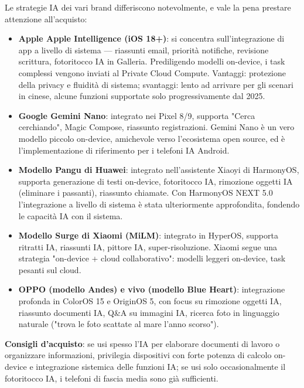 
Le strategie IA dei vari brand differiscono notevolmente, e vale la pena prestare attenzione all'acquisto:

\begin{itemize}
  \item \textbf{Apple Apple Intelligence (iOS 18+)}: si concentra sull'integrazione di app a livello di sistema — riassunti email, priorità notifiche, revisione scrittura, fotoritocco IA in Galleria. Prediligendo modelli on-device, i task complessi vengono inviati al Private Cloud Compute. Vantaggi: protezione della privacy e fluidità di sistema; svantaggi: lento ad arrivare per gli scenari in cinese, alcune funzioni supportate solo progressivamente dal 2025.
  \item \textbf{Google Gemini Nano}: integrato nei Pixel 8/9, supporta "Cerca cerchiando", Magic Compose, riassunto registrazioni. Gemini Nano è un vero modello piccolo on-device, amichevole verso l'ecosistema open source, ed è l'implementazione di riferimento per i telefoni IA Android.
  \item \textbf{Modello Pangu di Huawei}: integrato nell'assistente Xiaoyi di HarmonyOS, supporta generazione di testi on-device, fotoritocco IA, rimozione oggetti IA (eliminare i passanti), riassunto chiamate. Con HarmonyOS NEXT 5.0 l'integrazione a livello di sistema è stata ulteriormente approfondita, fondendo le capacità IA con il sistema.
  \item \textbf{Modello Surge di Xiaomi (MiLM)}: integrato in HyperOS, supporta ritratti IA, riassunti IA, pittore IA, super-risoluzione. Xiaomi segue una strategia "on-device + cloud collaborativo": modelli leggeri on-device, task pesanti sul cloud.
  \item \textbf{OPPO (modello Andes) e vivo (modello Blue Heart)}: integrazione profonda in ColorOS 15 e OriginOS 5, con focus su rimozione oggetti IA, riassunto documenti IA, Q\&A su immagini IA, ricerca foto in linguaggio naturale ("trova le foto scattate al mare l'anno scorso").
\end{itemize}

\textbf{Consigli d'acquisto}: se usi spesso l'IA per elaborare documenti di lavoro o organizzare informazioni, privilegia dispositivi con forte potenza di calcolo on-device e integrazione sistemica delle funzioni IA; se usi solo occasionalmente il fotoritocco IA, i telefoni di fascia media sono già sufficienti.

